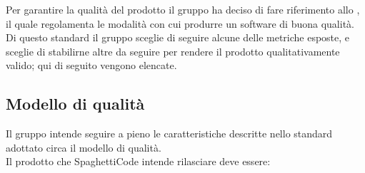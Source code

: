 \documentclass[../piano_di_qualifica.tex]{subfiles}
\begin{document}
Per garantire la qualità del prodotto il gruppo ha deciso di fare riferimento allo , il quale regolamenta le modalità con cui produrre un software di buona qualità. Di questo standard il gruppo sceglie di seguire alcune delle metriche esposte, e sceglie di stabilirne altre da seguire per rendere il prodotto qualitativamente valido; qui di seguito vengono elencate.

\subsection{Modello di qualità}
Il gruppo intende seguire a pieno le caratteristiche descritte nello standard adottato circa il modello di qualità.\\
Il prodotto che SpaghettiCode intende rilasciare deve essere:\\
\end{document}
